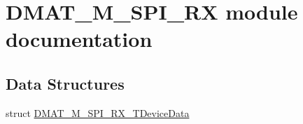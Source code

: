 \hypertarget{group___d_m_a_t___m___s_p_i___r_x__module}{\section{D\-M\-A\-T\-\_\-\-M\-\_\-\-S\-P\-I\-\_\-\-R\-X module documentation}
\label{group___d_m_a_t___m___s_p_i___r_x__module}
}
\subsection*{Data Structures}
\begin{DoxyCompactItemize}
\item 
struct \hyperlink{struct_d_m_a_t___m___s_p_i___r_x___t_device_data}{D\-M\-A\-T\-\_\-\-M\-\_\-\-S\-P\-I\-\_\-\-R\-X\-\_\-\-T\-Device\-Data}
\end{DoxyCompactItemize}
